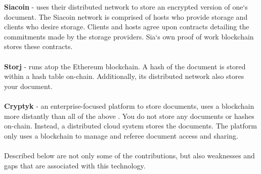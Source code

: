 \textbf{Siacoin}\cite{art7} - uses their distributed network to store an encrypted version of one`s document. The Siacoin network is comprised of hosts who provide storage and clients who desire storage. Clients and hosts agree upon contracts detailing the commitments made by the storage providers. Sia`s own proof of work blockchain stores these contracts.\\\\
\textbf{Storj}\cite{art8} - runs atop the Ethereum\cite{art9} blockchain. A hash of the document is stored within a hash table on-chain. Additionally, its distributed network also stores your document.\\\\
\textbf{Cryptyk}\cite{art10} - an enterprise-focused platform to store documents, uses a blockchain more distantly than all of the above	. You do not store any documents or hashes on-chain. Instead, a distributed cloud system stores the documents. The platform only uses a blockchain to manage and referee document access and sharing.\\\\
Described below are not only some of the contributions, but also weaknesses and gaps that are associated with this technology.
